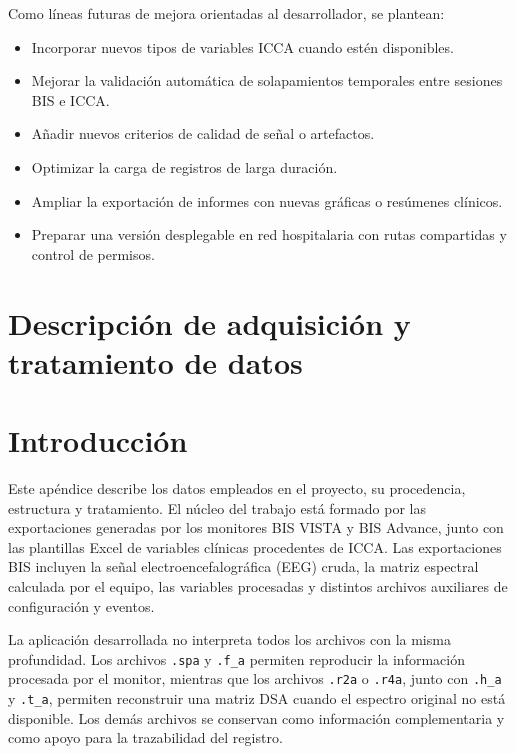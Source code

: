 \documentclass[
  spanish,
  a4paper,
  12pt,
  twoside]{memoir}
\providecommand{\tightlist}{%
  \setlength{\itemsep}{0pt}\setlength{\parskip}{0pt}}
\newcommand{\apendice}[1]{\chapter{#1}}
\begin{document}
Como líneas futuras de mejora orientadas al desarrollador, se plantean:

\begin{itemize}
\tightlist
\item
  Incorporar nuevos tipos de variables ICCA cuando estén disponibles.
\item
  Mejorar la validación automática de solapamientos temporales entre
  sesiones BIS e ICCA.
\item
  Añadir nuevos criterios de calidad de señal o artefactos.
\item
  Optimizar la carga de registros de larga duración.
\item
  Ampliar la exportación de informes con nuevas gráficas o resúmenes
  clínicos.
\item
  Preparar una versión desplegable en red hospitalaria con rutas
  compartidas y control de permisos.
\end{itemize}


\apendice{Descripción de adquisición y tratamiento de datos}

\chapter{Introducción}\label{introducciuxf3n-1}

Este apéndice describe los datos empleados en el proyecto, su
procedencia, estructura y tratamiento. El núcleo del trabajo está
formado por las exportaciones generadas por los monitores BIS VISTA y
BIS Advance, junto con las plantillas Excel de variables clínicas
procedentes de ICCA. Las exportaciones BIS incluyen la señal
electroencefalográfica (EEG) cruda, la matriz espectral calculada por el
equipo, las variables procesadas y distintos archivos auxiliares de
configuración y eventos.

La aplicación desarrollada no interpreta todos los archivos con la misma
profundidad. Los archivos \texttt{.spa} y \texttt{.f\_a} permiten
reproducir la información procesada por el monitor, mientras que los
archivos \texttt{.r2a} o \texttt{.r4a}, junto con \texttt{.h\_a} y
\texttt{.t\_a}, permiten reconstruir una matriz DSA cuando el espectro
original no está disponible. Los demás archivos se conservan como
información complementaria y como apoyo para la trazabilidad del
registro.
\end{document}
